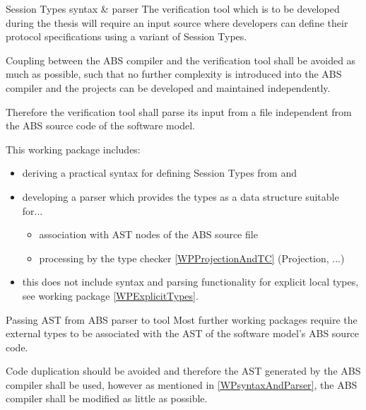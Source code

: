 \documentclass[paper=a4,nochapname,accentcolor=tud9c]{tudexercise}
\makeatletter
\def\namedlabel#1#2{\begingroup
    #1%
    \def\@currentlabel{\thedescriptcount}%
    \phantomsection\label{#2}\endgroup
}
\newcounter{descriptcount}
\renewcommand*\thedescriptcount{[\Alph{descriptcount}]}}
\renewcommand*\thedescriptcount{\roman{descriptcount}}}
\makeatother
\begin{document}
\begin{enumdescript}
\item[\namedlabel{Session Types syntax \& parser}{WPsyntaxAndParser}]%
    The verification tool which is to be developed during the thesis will require
    an input source where developers can define their protocol specifications using a variant of Session Types.

    Coupling between the ABS compiler and the verification tool shall be avoided
    as much as possible, such that no further complexity is introduced into the ABS
    compiler and the projects can be developed and maintained independently.
    
    Therefore the verification tool shall parse its input from a file independent
    from the ABS source code of the software model.

    This working package includes:
    \begin{itemize}
      \item deriving a practical syntax for defining Session Types from \cite{kamburjan2018stateful} and \cite{kamburjan2016session}
      \item developing a parser which provides the types as a data structure
        suitable for...
      \begin{itemize}
        \item association with AST nodes of the ABS source file
        \item processing by the type checker \ref{WPProjectionAndTC} (Projection, ...)
      \end{itemize}
      \item this does not include syntax and parsing functionality for explicit
        local types, see working package \ref{WPExplicitTypes}.
    \end{itemize}
  \item[\namedlabel{Passing AST from ABS parser to tool}{WPPassAST}]%
    Most further working packages require the external types to be associated with
    the AST of the software model's ABS source code.

    Code duplication should be avoided and therefore the AST generated by the
    ABS compiler shall be used, however as mentioned in \ref{WPsyntaxAndParser},
    the ABS compiler shall be modified as little as possible.


\end{enumdescript}
\end{document}
